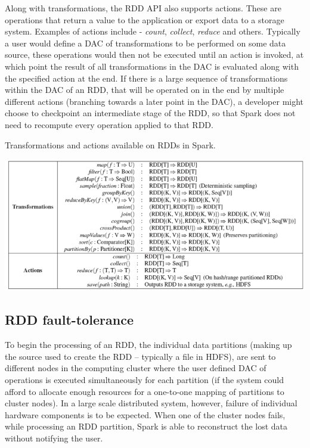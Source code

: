 \documentclass{l4proj}
\begin{document}
Along with transformations, the RDD API also supports actions. These are operations that return a value to the application or export data to a storage system. Examples of actions include - \textit{count}, \textit{collect}, \textit{reduce} and others. Typically a user would define a DAC of transformations to be performed on some data source, these operations would then not be executed until an action is invoked, at which point the result of all transformations in the DAC is evaluated along with the specified action at the end. If there is a large sequence of transformations within the DAC of an RDD, that will be operated on in the end by multiple different actions (branching towards a later point in the DAC), a developer might choose to checkpoint an intermediate stage of the RDD, so that Spark does not need to recompute every operation applied to that RDD.

\begin{table}[H]
\label{Actions and Transformations}
\caption{Transformations and actions available on RDDs in Spark.}
\includegraphics[width=1.0\textwidth]{images/spark-trans-action-edited}
\end{table}

\subsection{RDD fault-tolerance}

To begin the processing of an RDD, the individual data partitions (making up the source used to create the RDD -- typically a file in HDFS), are sent to different nodes in the computing cluster where the user defined DAC of operations is executed simultaneously for each partition (if the system could afford to allocate enough resources for a one-to-one mapping of partitions to cluster nodes). In a large scale distributed system, however, failure of individual hardware components is to be expected. When one of the cluster nodes fails, while processing an RDD partition, Spark is able to reconstruct the lost data without notifying the user.
\end{document}
